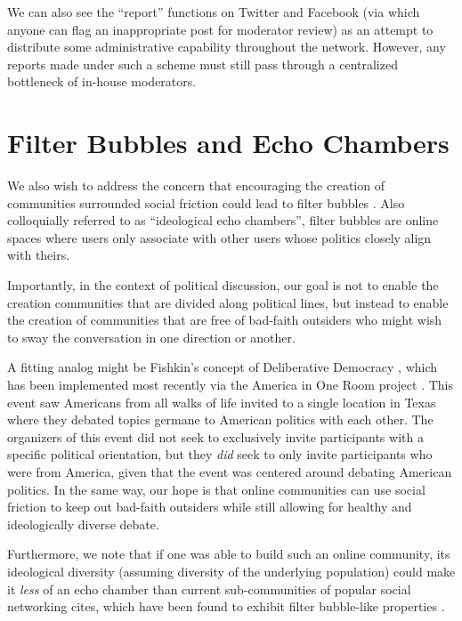 \documentclass[sigconf,authordraft]{acmart}
\begin{document}
We can also see the ``report'' functions on Twitter and Facebook (via which anyone can flag an inappropriate post for moderator review) as an attempt to distribute some administrative capability throughout the network. However, any reports made under such a scheme must still pass through a centralized bottleneck of in-house moderators. 


\section{Filter Bubbles and Echo Chambers}

We also wish to address the concern that encouraging the creation of communities surrounded social friction could lead to filter bubbles \cite{pariser2011filter}. Also colloquially referred to as ``ideological echo chambers'', filter bubbles are online spaces where users only associate with other users whose politics closely align with theirs.  

Importantly, in the context of political discussion, our goal is not to enable the creation communities that are divided along political lines, but instead to enable the creation of communities that are free of bad-faith outsiders who might wish to sway the conversation in one direction or another. 

A fitting analog might be Fishkin's concept of Deliberative Democracy \cite{fishkin1991democracy}, which has been implemented most recently via the America in One Room project \cite{AmericaInOneRoom}. This event saw Americans from all walks of life invited to a single location in Texas where they debated topics germane to American politics with each other. The organizers of this event did not seek to exclusively invite participants with a specific political orientation, but they {\itshape did} seek to only invite participants who were from America, given that the event was centered around debating American politics. In the same way, our hope is that online communities can use social friction to keep out bad-faith outsiders while still allowing for healthy and ideologically diverse debate.

Furthermore, we note that if one was able to build such an online community, its ideological diversity (assuming diversity of the underlying population) could make it {\itshape less} of an echo chamber than current sub-communities of popular social networking cites, which have been found to exhibit filter bubble-like properties \cite{pariser2011filter, garimella2018political}.
\end{document}
